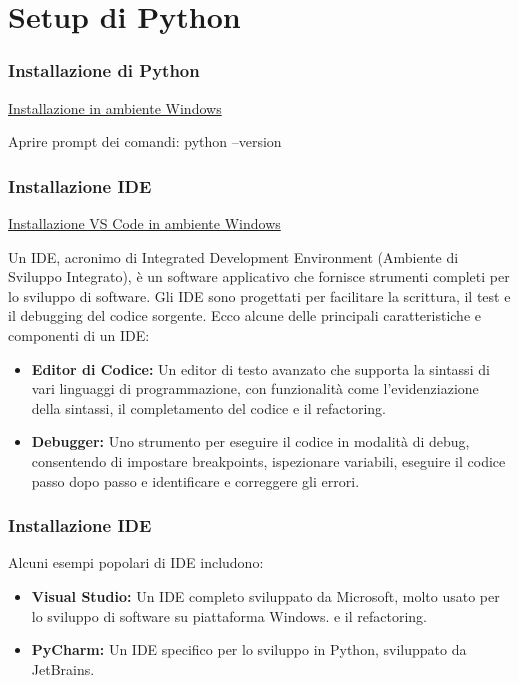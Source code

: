 \documentclass{beamer}
\begin{document}
{\begin{frame}
\end{frame}

\section{Setup di Python}

\begin{frame}
    \frametitle{Installazione di Python}

    \href{https://www.freecodecamp.org/italian/news/come-installare-python-su-windows/}{Installazione in ambiente Windows}

    Aprire prompt dei comandi:
    python --version

\end{frame}


\begin{frame}

    \frametitle{Installazione IDE}

    \href{https://code.visualstudio.com/download}{Installazione VS Code in ambiente Windows}

    Un IDE, acronimo di Integrated Development Environment (Ambiente di Sviluppo Integrato), è un software applicativo che fornisce strumenti completi per lo sviluppo di software. Gli IDE sono progettati per facilitare la scrittura, il test e il debugging del codice sorgente. Ecco alcune delle principali caratteristiche e componenti di un IDE:

    \begin{itemize}
        \item \textbf{Editor di Codice:} Un editor di testo avanzato che supporta la sintassi di vari linguaggi di programmazione, con funzionalità come l'evidenziazione della sintassi, il completamento del codice e il refactoring.
        \item \textbf{Debugger:} Uno strumento per eseguire il codice in modalità di debug, consentendo di impostare breakpoints, ispezionare variabili, eseguire il codice passo dopo passo e identificare e correggere gli errori.
    \end{itemize}
    
\end{frame}

\begin{frame}

    \frametitle{Installazione IDE}

    Alcuni esempi popolari di IDE includono:

    \begin{itemize}
        \item \textbf{Visual Studio:} Un IDE completo sviluppato da Microsoft, molto usato per lo sviluppo di software su piattaforma Windows. e il refactoring.
        \item \textbf{PyCharm:} Un IDE specifico per lo sviluppo in Python, sviluppato da JetBrains.
    \end{itemize}
    

\end{frame}}
\end{document}
